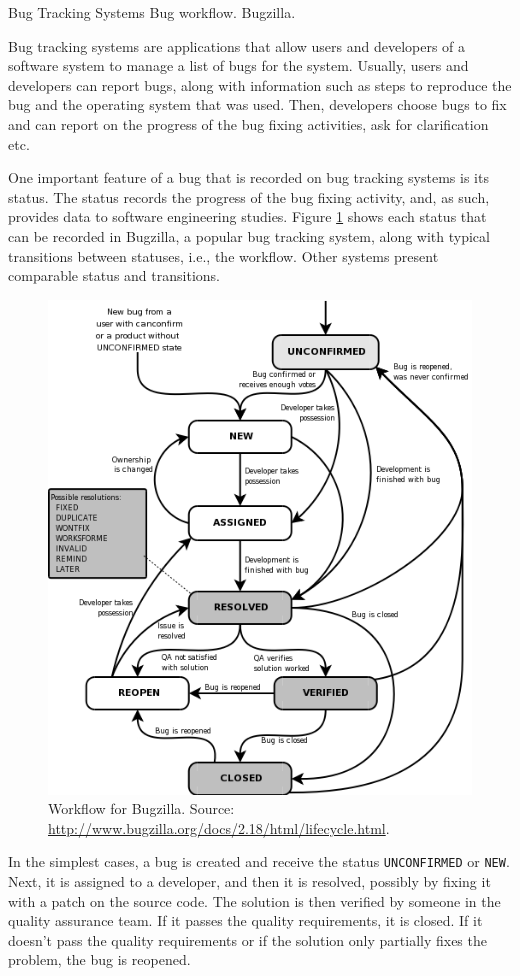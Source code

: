   \begin{subsection}{Bug Tracking Systems}
Bug workflow. Bugzilla. \cite{Bird2009}

Bug tracking systems are applications that allow users and developers of a software system to manage a list of bugs for the system. Usually, users and developers can report bugs, along with information such as steps to reproduce the bug and the operating system that was used. Then, developers choose bugs to fix and can report on the progress of the bug fixing activities, ask for clarification etc.

One important feature of a bug that is recorded on bug tracking systems is its status. The status records the progress of the bug fixing activity, and, as such, provides data to software engineering studies. Figure \ref{fig:bugzilla} shows each status that can be recorded in Bugzilla, a popular bug tracking system, along with typical transitions between statuses, i.e., the workflow. Other systems present comparable status and transitions.

\begin{figure}[ht]
	\centering
		\includegraphics[scale=0.4]{bugzilla.png}
	\caption{Workflow for Bugzilla. Source: \url{http://www.bugzilla.org/docs/2.18/html/lifecycle.html}.}
	\label{fig:bugzilla}
\end{figure}

In the simplest cases, a bug is created and receive the status \texttt{UNCONFIRMED} or \texttt{NEW}. Next, it is assigned to a developer, and then it is resolved, possibly by fixing it with a patch on the source code. The solution is then verified by someone in the quality assurance team. If it passes the quality requirements, it is closed. If it doesn’t pass the quality requirements or if the solution only partially fixes the problem, the bug is reopened.
\end{subsection}

